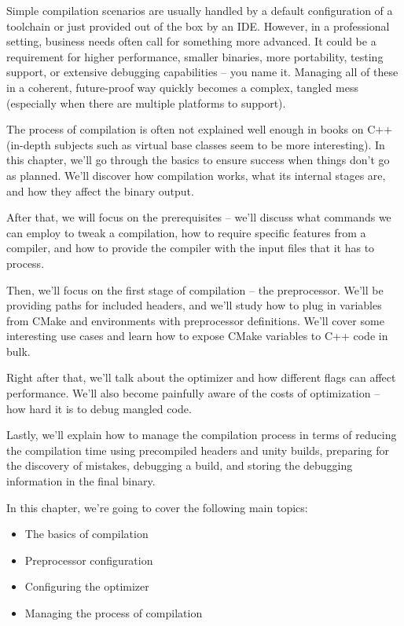 Simple compilation scenarios are usually handled by a default configuration of a toolchain or just provided out of the box by an IDE. However, in a professional setting, business needs often call for something more advanced. It could be a requirement for higher performance, smaller binaries, more portability, testing support, or extensive debugging capabilities – you name it. Managing all of these in a coherent, future-proof way quickly becomes a complex, tangled mess (especially when there are multiple platforms to support).

The process of compilation is often not explained well enough in books on C++ (in-depth subjects such as virtual base classes seem to be more interesting). In this chapter, we'll go through the basics to ensure success when things don't go as planned. We'll discover how compilation works, what its internal stages are, and how they affect the binary output.

After that, we will focus on the prerequisites – we'll discuss what commands we can employ to tweak a compilation, how to require specific features from a compiler, and how to provide the compiler with the input files that it has to process.

Then, we'll focus on the first stage of compilation – the preprocessor. We'll be providing paths for included headers, and we'll study how to plug in variables from CMake and environments with preprocessor definitions. We'll cover some interesting use cases and learn how to expose CMake variables to C++ code in bulk.

Right after that, we'll talk about the optimizer and how different flags can affect performance. We'll also become painfully aware of the costs of optimization – how hard it is to debug mangled code.

Lastly, we'll explain how to manage the compilation process in terms of reducing the compilation time using precompiled headers and unity builds, preparing for the discovery of mistakes, debugging a build, and storing the debugging information in the final binary.

In this chapter, we're going to cover the following main topics:

\begin{itemize}
\item 
The basics of compilation

\item 
Preprocessor configuration

\item 
Configuring the optimizer

\item 
Managing the process of compilation
\end{itemize}